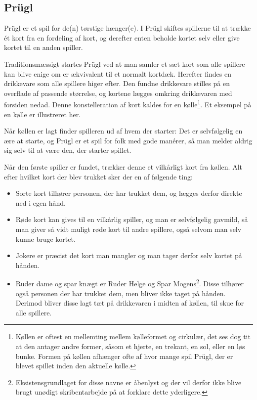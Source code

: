 \subsection{Prügl}
Prügl er et spil for de(n) tørstige hænger(e). I Prügl skiftes spillerne til at trække ét kort fra en fordeling af kort, og derefter enten beholde kortet selv eller give kortet til en anden spiller.

Traditionsmæssigt startes Prügl ved at man samler et sæt kort som alle spillere kan blive enige om er ækvivalent til et normalt kortdæk. Herefter findes en drikkevare som alle spillere higer efter. Den fundne drikkevare stilles på en overflade af passende størrelse, og kortene lægges omkring drikkevaren med forsiden nedad. Denne konstelleration af kort kaldes for en kølle\footnote{Køllen er oftest en mellemting mellem kølleformet og cirkulær, det ses dog tit at den antager andre former, såsom et hjerte, en trekant, en sol, eller en løs bunke. Formen på køllen afhænger ofte af hvor mange spil Prügl, der er blevet spillet inden den aktuelle kølle.}. Et eksempel på en kølle er illustreret her.


Når køllen er lagt finder spilleren ud af hvem der starter: Det er selvfølgelig en ære at starte, og Prügl er et spil for folk med gode manérer, så man melder aldrig sig selv til at være den, der starter spillet.

Når den første spiller er fundet, trækker denne et vilkårligt kort fra køllen. Alt efter hvilket kort der blev trukket sker der en af følgende ting:

\begin{itemize}
    \item Sorte kort tilhører personen, der har trukket dem, og lægges derfor direkte ned i egen hånd.
    \item Røde kort kan gives til en vilkårlig spiller, og man er selvfølgelig gavmild, så man giver så vidt muligt røde kort til andre spillere, også selvom man selv kunne bruge kortet.
    \item Jokere er præcist det kort man mangler og man tager derfor selv kortet på hånden.
    \item Ruder dame og spar knægt er Ruder Helge og Spar Mogens\footnote{Eksistensgrundlaget for disse navne er åbenlyst og der vil derfor ikke blive brugt unødigt skribentarbejde på at forklare dette yderligere.}. Disse tilhører også personen der har trukket dem, men bliver ikke taget på hånden. Derimod bliver disse lagt tæt på drikkevaren i midten af køllen, til skue for alle spillere.
\end{itemize}

